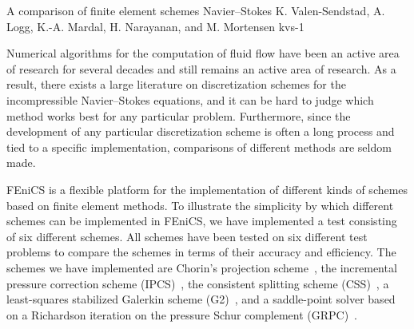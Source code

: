               {A comparison of finite element schemes Navier--Stokes}
              {K. Valen-Sendstad, A. Logg, K.-A. Mardal, H. Narayanan, and M. Mortensen}
              {kvs-1}

\newcommand{\css}[1]{$\mathrm{CSS}_{#1}$}

\newcommand{\scheme}[3]{%
\begin{figure}
  \begin{center}
    \small
    \begin{tabular}{l}
      \hline
      \textbf{Scheme #1:} #2 \\
      \hline
      \begin{minipage}{0.9\textwidth}
        \vspace{0.1cm}
        \begin{enumerate}
          #3
        \end{enumerate}
        \vspace{0.1cm}
      \end{minipage} \\
      \hline
    \end{tabular}
    \normalsize
  \end{center}
\end{figure}}

Numerical algorithms for the computation of fluid flow have been an
active area of research for several decades and still remains an
active area of research. As a result, there exists a large literature
on discretization schemes for the incompressible Navier--Stokes
equations, and it can be hard to judge which method works best for any
particular problem. Furthermore, since the development of any
particular discretization scheme is often a long process and tied to a
specific implementation, comparisons of different methods are seldom
made.

FEniCS is a flexible platform for the implementation of different
kinds of schemes based on finite element methods. To illustrate the
simplicity by which different schemes can be implemented in FEniCS, we
have implemented a test consisting of six different schemes. All
schemes have been tested on six different test problems to compare the
schemes in terms of their accuracy and efficiency. The schemes we have
implemented are Chorin's projection scheme~\cite{chorin, temam}, the
incremental pressure correction scheme (IPCS)~\cite{Goda197976}, the
consistent splitting scheme (CSS)~\cite{guemin}, a least-squares
stabilized Galerkin scheme (G2)~\cite{JohnsonHoffman}, and a
saddle-point solver based on a Richardson iteration on the pressure
Schur complement (GRPC)~\cite{turek}.

